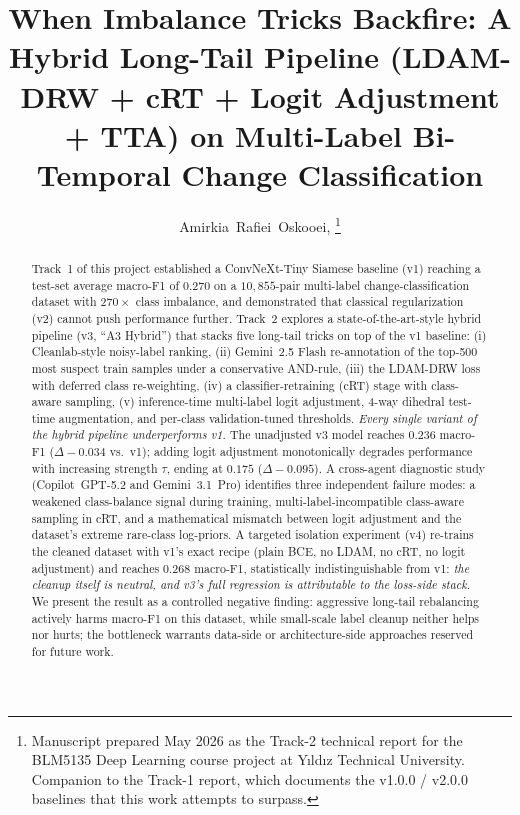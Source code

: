 \documentclass[journal]{IEEEtran}
\begin{document}
\title{When Imbalance Tricks Backfire: A Hybrid Long-Tail Pipeline (LDAM-DRW + cRT + Logit Adjustment + TTA) on Multi-Label Bi-Temporal Change Classification}

\author{%
  Amirkia~Rafiei~Oskooei,
  \thanks{Manuscript prepared May 2026 as the Track-2 technical report for the BLM5135 Deep Learning course project at Y\i ld\i z Technical University. Companion to the Track-1 report, which documents the v1.0.0 / v2.0.0 baselines that this work attempts to surpass.}
}


\maketitle

\begin{abstract}
Track~1 of this project established a ConvNeXt-Tiny Siamese baseline (v1) reaching a test-set average macro-F1 of $0.270$ on a $10{,}855$-pair multi-label change-classification dataset with $270\times$ class imbalance, and demonstrated that classical regularization (v2) cannot push performance further. Track~2 explores a state-of-the-art-style hybrid pipeline (v3, ``A3 Hybrid'') that stacks five long-tail tricks on top of the v1 baseline: (i) Cleanlab-style noisy-label ranking, (ii) Gemini~2.5 Flash re-annotation of the top-500 most suspect train samples under a conservative AND-rule, (iii) the LDAM-DRW loss with deferred class re-weighting, (iv) a classifier-retraining (cRT) stage with class-aware sampling, (v) inference-time multi-label logit adjustment, 4-way dihedral test-time augmentation, and per-class validation-tuned thresholds. \emph{Every single variant of the hybrid pipeline underperforms v1.} The unadjusted v3 model reaches $0.236$ macro-F1 ($\Delta\!-\!0.034$ vs.\ v1); adding logit adjustment monotonically degrades performance with increasing strength $\tau$, ending at $0.175$ ($\Delta\!-\!0.095$). A cross-agent diagnostic study (Copilot~GPT-5.2 and Gemini~3.1~Pro) identifies three independent failure modes: a weakened class-balance signal during training, multi-label-incompatible class-aware sampling in cRT, and a mathematical mismatch between logit adjustment and the dataset's extreme rare-class log-priors. A targeted isolation experiment (v4) re-trains the cleaned dataset with v1's exact recipe (plain BCE, no LDAM, no cRT, no logit adjustment) and reaches $0.268$ macro-F1, statistically indistinguishable from v1: \emph{the cleanup itself is neutral, and v3's full regression is attributable to the loss-side stack}. We present the result as a controlled negative finding: aggressive long-tail rebalancing actively harms macro-F1 on this dataset, while small-scale label cleanup neither helps nor hurts; the bottleneck warrants data-side or architecture-side approaches reserved for future work.
\end{abstract}
\end{document}
